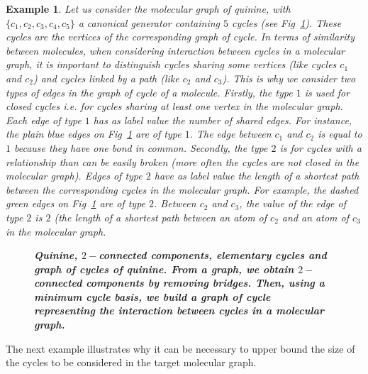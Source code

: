 \documentclass[10pt,letterpaper]{article}
\newtheorem{example}{Example}
\begin{document}
\begin{example}
\normalfont

Let us consider the molecular graph of quinine, with $\{c_1, c_2, c_3, c_4, c_5\}$ a canonical generator containing $5$ cycles (see Fig~\ref{fig3}). These cycles are the vertices of the corresponding graph of cycle. In terms of similarity between molecules, when considering interaction between cycles in a molecular graph, it is important to distinguish cycles sharing some vertices (like cycles $c_1$ and $c_2$) and cycles linked by a path (like $c_2$ and $c_3$). This is why we consider two types of edges in the graph of cycle of a molecule. Firstly, the type $1$ is used for closed cycles \textit{i.e.} for cycles sharing at least one vertex in the molecular graph. Each edge of type $1$ has as label value the number of shared edges. For instance, the plain blue edges on Fig~\ref{fig3} are of type $1$. The edge between $c_1$ and $c_2$ is equal to $1$ because they have one bond in common. Secondly, the type $2$ is for cycles with a relationship than can be easily broken (more often the cycles are not closed in the molecular graph). Edges of type $2$ have as label value the length of a shortest path between the corresponding cycles in the molecular graph. For example, the dashed green edges on Fig~\ref{fig3} are of type $2$. Between $c_2$ and $c_3$, the value of the edge of type $2$ is $2$ (the length of a shortest path between an atom of $c_2$ and an atom of $c_3$ in the molecular graph.

 
\begin{figure}[!h]
	\caption{\bf{Quinine, $2-$connected components, elementary cycles and graph of cycles of quinine.} 
	From a graph, we obtain $2-$connected components by removing bridges. Then, using a minimum cycle basis, we build a graph of cycle  representing the interaction between cycles in a molecular graph.}
	\label{fig3}
\end{figure}
\end{example}

The next example illustrates why it can be necessary to upper bound the size of the cycles to be considered in the target molecular graph.
\end{document}
